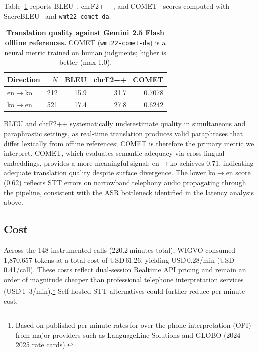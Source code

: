 \documentclass[11pt]{article}
\begin{document}
Table~\ref{tab:translation} reports BLEU~\citep{papineni_bleu_2002}, chrF2++~\citep{popovic_chrf_2015}, and COMET~\citep{rei_comet_2020} scores computed with SacreBLEU~\citep{post_sacrebleu_2018} and \texttt{wmt22-comet-da}.

\begin{table}[t]
  \centering
  \small
  \begin{tabular}{lrrrr}
    \toprule
    \textbf{Direction} & $N$ & \textbf{BLEU} & \textbf{chrF2++} & \textbf{COMET} \\
    \midrule
    en$\to$ko & 212 & 15.9 & 31.7 & 0.7078 \\
    ko$\to$en & 521 & 17.4 & 27.8 & 0.6242 \\
    \bottomrule
  \end{tabular}
  \caption{\textbf{Translation quality against Gemini~2.5 Flash offline references.} COMET (\texttt{wmt22-comet-da}) is a neural metric trained on human judgments; higher is better (max 1.0).}
  \label{tab:translation}
\end{table}

BLEU and chrF2++ systematically underestimate quality in simultaneous and paraphrastic settings, as real-time translation produces valid paraphrases that differ lexically from offline references; COMET is therefore the primary metric we interpret. COMET, which evaluates semantic adequacy via cross-lingual embeddings, provides a more meaningful signal: en$\to$ko achieves 0.71, indicating adequate translation quality despite surface divergence. The lower ko$\to$en score (0.62) reflects STT errors on narrowband telephony audio propagating through the pipeline, consistent with the ASR bottleneck identified in the latency analysis above.

\subsection{Cost}

Across the 148 instrumented calls (220.2 minutes total), WIGVO consumed 1{,}870{,}657 tokens at a total cost of USD\,61.26, yielding USD\,0.28/min (USD\,0.41/call). These costs reflect dual-session Realtime API pricing and remain an order of magnitude cheaper than professional telephone interpretation services (USD\,1--3/min).\footnote{Based on published per-minute rates for over-the-phone interpretation (OPI) from major providers such as LanguageLine Solutions and GLOBO (2024--2025 rate cards).} Self-hosted STT alternatives could further reduce per-minute cost.
\end{document}
